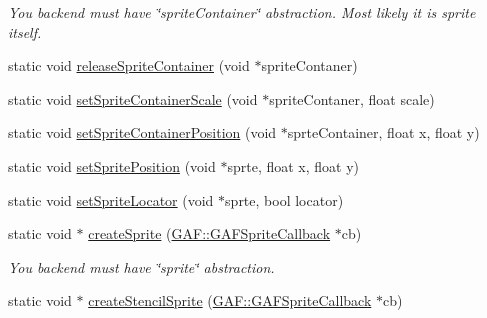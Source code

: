 \begin{DoxyCompactItemize}
\begin{DoxyCompactList}\small\item\em You backend must have \char`\"{}sprite\-Container\char`\"{} abstraction. Most likely it is sprite itself. \end{DoxyCompactList}\item 
static void \hyperlink{class_g_a_f_1_1_g_a_f_marmalade_g_f_x_a7cd848f49d9aa6845a7c3d23b398b962}{release\-Sprite\-Container} (void $\ast$sprite\-Contaner)
\item 
static void \hyperlink{class_g_a_f_1_1_g_a_f_marmalade_g_f_x_a5ca22e99c8365ea12c844204b2a490ca}{set\-Sprite\-Container\-Scale} (void $\ast$sprite\-Contaner, float scale)
\item 
static void \hyperlink{class_g_a_f_1_1_g_a_f_marmalade_g_f_x_a0b97999d542ee4f2a303b0e62db74e86}{set\-Sprite\-Container\-Position} (void $\ast$sprte\-Container, float x, float y)
\item 
static void \hyperlink{class_g_a_f_1_1_g_a_f_marmalade_g_f_x_a99623ee7afb73f8b34ea38558d48d550}{set\-Sprite\-Position} (void $\ast$sprte, float x, float y)
\item 
static void \hyperlink{class_g_a_f_1_1_g_a_f_marmalade_g_f_x_a27662973702e6c78a2ea08d9b1a2f66e}{set\-Sprite\-Locator} (void $\ast$sprte, bool locator)
\item 
\hypertarget{class_g_a_f_1_1_g_a_f_marmalade_g_f_x_a532e1b916a435589f352be1d0fd64be1}{static void $\ast$ \hyperlink{class_g_a_f_1_1_g_a_f_marmalade_g_f_x_a532e1b916a435589f352be1d0fd64be1}{create\-Sprite} (\hyperlink{class_g_a_f_1_1_g_a_f_sprite_callback}{G\-A\-F\-::\-G\-A\-F\-Sprite\-Callback} $\ast$cb)}\label{class_g_a_f_1_1_g_a_f_marmalade_g_f_x_a532e1b916a435589f352be1d0fd64be1}

\begin{DoxyCompactList}\small\item\em You backend must have \char`\"{}sprite\char`\"{} abstraction. \end{DoxyCompactList}\item 
\hypertarget{class_g_a_f_1_1_g_a_f_marmalade_g_f_x_a8576303216810d7cf998033bbb448eb3}{static void $\ast$ \hyperlink{class_g_a_f_1_1_g_a_f_marmalade_g_f_x_a8576303216810d7cf998033bbb448eb3}{create\-Stencil\-Sprite} (\hyperlink{class_g_a_f_1_1_g_a_f_sprite_callback}{G\-A\-F\-::\-G\-A\-F\-Sprite\-Callback} $\ast$cb)}\label{class_g_a_f_1_1_g_a_f_marmalade_g_f_x_a8576303216810d7cf998033bbb448eb3}


\end{DoxyCompactItemize}
